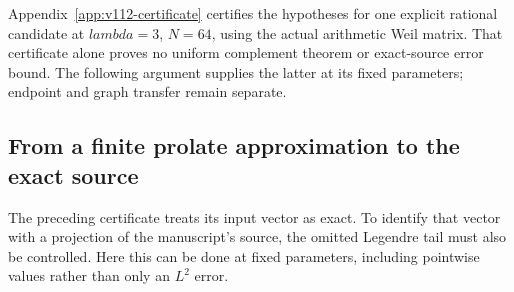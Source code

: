 \documentclass[11pt]{article}
\def\lambda{lambda}%
\theoremstyle{remark}
\begin{document}
Appendix~\ref{app:v112-certificate} certifies the hypotheses for one
explicit rational candidate at $\lambda=3$, $N=64$, using the actual
arithmetic Weil matrix. That certificate alone proves no uniform complement theorem or
exact-source error bound. The following argument supplies the latter
at its fixed parameters; endpoint and graph transfer remain separate.


\subsection{From a finite prolate approximation to the exact source}
The preceding certificate treats its input vector as exact. To identify
that vector with a projection of the manuscript's source, the omitted
Legendre tail must also be controlled. Here this can be done at fixed
parameters, including pointwise values rather than only an $L^2$ error.
\end{document}
